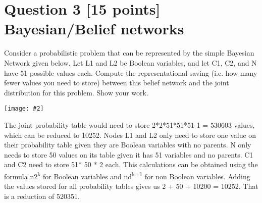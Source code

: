 \documentclass{article}
\def\ans#1{{\color{ans}#1}}
\newcommand{\centerfig}[2]{\begin{center}\texttt{[image: \#2]}\end{center}}
\begin{document}
\clearpage
\section{Question 3 [15 points] Bayesian/Belief networks}
Consider a probabilistic problem that can be represented by the simple Bayesian Network given below. Let L1 and L2 be Boolean variables, and let C1, C2, and N have 51 possible values each. Compute the representational saving (i.e. how many fewer values you need to store) between this belief network and the joint distribution for this problem. Show your work. \\
\centerfig{0.4}{../figs/fig2}
\ans{
    The joint probability table would need to store 2*2*51*51*51-1 = 530603 values, which 
    can be reduced to 10252. Nodes L1 and L2 only need to store one value on their probability table given they are Boolean variables with no parents. N only needs to store 50 values on its table given it has 51 variables and no parents. C1 and C2 need to store 51* 50 * 2 each. This calculations can be obtained using the formula n2\textsuperscript{k} for Boolean variables and nd\textsuperscript{k+1} for non Boolean variables. Adding the values stored for all probability tables gives us 2 + 50 + 10200 = 10252. That is a reduction of 520351.
}

\clearpage
\end{document}
